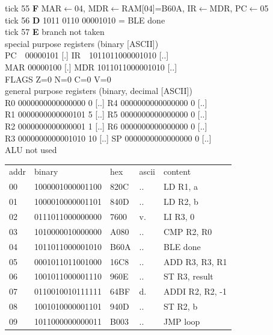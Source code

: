 \noindent\begin{tcolorbox}[stepbox, title={Instruction 19 \hfill ticks 55 to 57 \quad BLE done}]
\textcolor{dim}{tick 55} \textbf{F} MAR$\leftarrow$04, MDR$\leftarrow$RAM[04]=B60A, IR$\leftarrow$MDR, PC$\leftarrow$05\\
\textcolor{dim}{tick 56} \textbf{D} 1011 0110 00001010 = BLE done\\
\textcolor{dim}{tick 57} \textbf{E} branch not taken\\[2pt]
\textcolor{dim}{special purpose registers (binary [ASCII])}\\
PC~~00000101 [.] \hfill IR~~1011011000001010 [..]\\
MAR 00000100 [.] \hfill MDR 1011011000001010 [..]\\
FLAGS Z=0 N=0 C=0 V=0\\[2pt]
\textcolor{dim}{general purpose registers (binary, decimal [ASCII])}\\
R0 0000000000000000 0 [..] \hfill R4 0000000000000000 0 [..]\\
R1 0000000000000101 5 [..] \hfill R5 0000000000000000 0 [..]\\
R2 0000000000000001 1 [..] \hfill R6 0000000000000000 0 [..]\\
R3 0000000000001010 10 [..] \hfill SP 0000000000000000 0 [..]\\
\textcolor{dim}{ALU not used}\\[2pt]
{\setlength{\tabcolsep}{2pt}\begin{tabular}{@{}lllll@{}}
\textcolor{dim}{addr} & \textcolor{dim}{binary} & \textcolor{dim}{hex} & \textcolor{dim}{ascii} & \textcolor{dim}{content}\\
00 & 1000001000001100 & 820C & .. & LD R1, a\\
01 & 1000010000001101 & 840D & .. & LD R2, b\\
02 & 0111011000000000 & 7600 & v. & LI R3, 0\\
03 & 1010000010000000 & A080 & .. & CMP R2, R0\\
04 & 1011011000001010 & B60A & .. & BLE done\\
\rowcolor{pcc}05 & 0001011011001000 & 16C8 & .. & ADD R3, R3, R1\\
06 & 1001011000001110 & 960E & .. & ST R3, result\\
07 & 0110010010111111 & 64BF & d. & ADDI R2, R2, -1\\
08 & 1001010000001101 & 940D & .. & ST R2, b\\
09 & 1011000000000011 & B003 & .. & JMP loop\\

\end{tabular}}
\end{tcolorbox}
